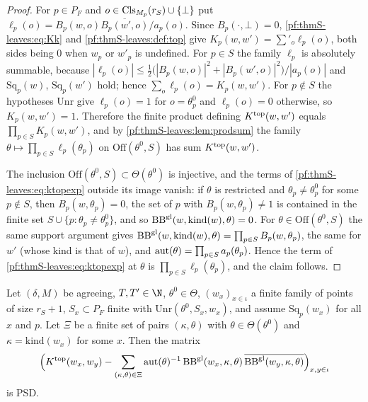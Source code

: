 \begin{proof}
For $p\in P_F$ and $o\in\mathrm{Cls}_{M_p}(r_S)\cup\{\bot\}$ put $\ell_p(o)=B_p(w,o)\overline{B_p(w',o)}/a_p(o)$.
Since $B_p(\cdot,\bot)=0$, \eqref{pf:thmS-leaves:eq:Kk} and \cref{pf:thmS-leaves:def:top} give
$K_p(w,w')=\sum'_o\ell_p(o)$, both sides being $0$ when $w_p$ or $w'_p$ is undefined. For $p\in S$ the family
$\ell_p$ is absolutely summable, because $|\ell_p(o)|\le\frac12\bigl(|B_p(w,o)|^2+|B_p(w',o)|^2\bigr)/|a_p(o)|$ and
$\mathrm{Sq}_p(w)$, $\mathrm{Sq}_p(w')$ hold; hence $\sum_o\ell_p(o)=K_p(w,w')$. For $p\notin S$ the hypotheses
$\mathrm{Unr}$ give $\ell_p(o)=1$ for $o=\theta^0_p$ and $\ell_p(o)=0$ otherwise, so $K_p(w,w')=1$. Therefore the
finite product defining $K^{\mathrm{top}}(w,w')$ equals $\prod_{p\in S}K_p(w,w')$, and by
\cref{pf:thmS-leaves:lem:prodsum} the family $\theta\mapsto\prod_{p\in S}\ell_p(\theta_p)$ on
$\mathrm{Off}(\theta^0,S)$ has sum $K^{\mathrm{top}}(w,w')$.

The inclusion $\mathrm{Off}(\theta^0,S)\subset\Theta(\theta^0)$ is injective, and the terms of
\eqref{pf:thmS-leaves:eq:ktopexp} outside its image vanish: if $\theta$ is restricted and $\theta_p\ne\theta^0_p$ for
some $p\notin S$, then $B_p(w,\theta_p)=0$, the set of $p$ with $B_p(w,\theta_p)\ne1$ is contained in the finite set
$S\cup\{p:\theta_p\ne\theta^0_p\}$, and so $\mathrm{BB}^{\mathrm{gl}}(w,\mathrm{kind}(w),\theta)=0$. For
$\theta\in\mathrm{Off}(\theta^0,S)$ the same support argument gives
$\mathrm{BB}^{\mathrm{gl}}(w,\mathrm{kind}(w),\theta)=\prod_{p\in S}B_p(w,\theta_p)$, the same for $w'$ (whose kind is that of $w$),
and $\mathrm{aut}(\theta)=\prod_{p\in S}a_p(\theta_p)$. Hence the term of \eqref{pf:thmS-leaves:eq:ktopexp} at
$\theta$ is $\prod_{p\in S}\ell_p(\theta_p)$, and the claim follows.
\end{proof}

\begin{corollary}\label{pf:thmS-leaves:cor:ktop}
Let $(\delta,M)$ be agreeing, $T,T'\in\N$, $\theta^0\in\Theta$, $(w_x)_{x\in\iota}$ a finite family of points of size
$r_S+1$, $S_x\subset P_F$ finite with $\mathrm{Unr}(\theta^0,S_x,w_x)$, and assume $\mathrm{Sq}_p(w_x)$ for all $x$ and
$p$. Let $\Xi$ be a finite set of pairs $(\kappa,\theta)$ with $\theta\in\Theta(\theta^0)$ and $\kappa=\mathrm{kind}(w_x)$
for some $x$. Then the matrix
\[
\Bigl(K^{\mathrm{top}}(w_x,w_y)-\sum_{(\kappa,\theta)\in\Xi}\mathrm{aut}(\theta)^{-1}\,\mathrm{BB}^{\mathrm{gl}}(w_x,\kappa,\theta)\,
\overline{\mathrm{BB}^{\mathrm{gl}}(w_y,\kappa,\theta)}\Bigr)_{x,y\in\iota}
\]
is PSD.
\end{corollary}

